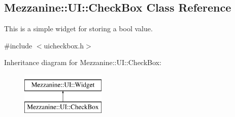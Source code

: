 \hypertarget{classMezzanine_1_1UI_1_1CheckBox}{
\subsection{Mezzanine::UI::CheckBox Class Reference}
\label{classMezzanine_1_1UI_1_1CheckBox}
}


This is a simple widget for storing a bool value.  




{\ttfamily \#include $<$uicheckbox.h$>$}

Inheritance diagram for Mezzanine::UI::CheckBox:\begin{figure}[H]
\begin{center}
\leavevmode
\includegraphics[height=2.000000cm]{classMezzanine_1_1UI_1_1CheckBox}
\end{center}
\end{figure}
